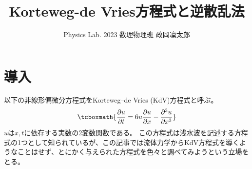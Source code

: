 \documentclass[11pt]{ltjsarticle}
\numberwithin{equation}{section}
\begin{document}
\title{Korteweg-de Vries方程式と逆散乱法}
\author{Physics Lab. 2023 数理物理班 政岡凜太郎}
\maketitle
\tableofcontents
\newpage
\section{
    導入
}

以下の非線形偏微分方程式をKorteweg–de Vries (KdV)方程式と呼ぶ。
\begin{align}\tcboxmath{
    \pdv{u}{t} = 6u\pdv{u}{x} - \pdv[3]{u}{x}
    \label{kdv-eq}
}\end{align}
$u$は$x,t$に依存する実数の2変数関数である。
この方程式は浅水波を記述する方程式の1つとして知られているが、この記事では流体力学からKdV方程式を導くようなことはせず、とにかく与えられた方程式を色々と調べてみようという立場をとる。
\end{document}
